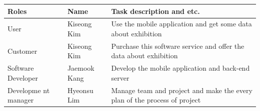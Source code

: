 \documentclass[conference]{IEEEtran}
\begin{document}
\begin{tabular}{|l|l|l|}\hline
 Roles& Name & Task description and etc. \\\hline\hline
User & Kiseong Kim & Use the mobile application and get some data about exhibition \\
Customer & Kiseong Kim & Purchase this software service and offer the data about exhibition \\
Software Developer & Jaemook Kang & Develop the mobile application and back-end server\\
Developme nt manager & Hyeonsu Lim &  Manage team and project and make the every plan of the process of project\\\hline

\end{tabular}
\\\\\\\\\\\\\\\\\\\\\\\\\\\\\\\\\\\\\\\\\\\\\\\\\\\\\\\\\\\\\\\\\\\\\\\\\\\\\\\\\\\\\\\\\\\\\\\\\\\\\\\\\
\end{document}

